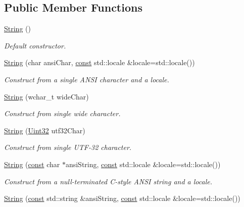 \subsection*{Public Member Functions}
\begin{DoxyCompactItemize}
\item 
\hyperlink{classsf_1_1_string_a9563a4e93f692e0c8e8702b374ef8692}{String} ()
\begin{DoxyCompactList}\small\item\em Default constructor. \end{DoxyCompactList}\item 
\hyperlink{classsf_1_1_string_ac9df7f7696cff164794e338f3c89ccc5}{String} (char ansi\-Char, \hyperlink{term__entry_8h_a57bd63ce7f9a353488880e3de6692d5a}{const} std\-::locale \&locale=std\-::locale())
\begin{DoxyCompactList}\small\item\em Construct from a single A\-N\-S\-I character and a locale. \end{DoxyCompactList}\item 
\hyperlink{classsf_1_1_string_aefaa202d2aa5ff85b4f75a5983367e86}{String} (wchar\-\_\-t wide\-Char)
\begin{DoxyCompactList}\small\item\em Construct from single wide character. \end{DoxyCompactList}\item 
\hyperlink{classsf_1_1_string_a8e1a5027416d121187908e2ed77079ff}{String} (\hyperlink{namespacesf_aa746fb1ddef4410bddf198ebb27e727c}{Uint32} utf32\-Char)
\begin{DoxyCompactList}\small\item\em Construct from single U\-T\-F-\/32 character. \end{DoxyCompactList}\item 
\hyperlink{classsf_1_1_string_a57d2b8c289f9894f859564cad034bfc7}{String} (\hyperlink{term__entry_8h_a57bd63ce7f9a353488880e3de6692d5a}{const} char $\ast$ansi\-String, \hyperlink{term__entry_8h_a57bd63ce7f9a353488880e3de6692d5a}{const} std\-::locale \&locale=std\-::locale())
\begin{DoxyCompactList}\small\item\em Construct from a null-\/terminated C-\/style A\-N\-S\-I string and a locale. \end{DoxyCompactList}\item 
\hyperlink{classsf_1_1_string_a0aa41dcbd17b0c36c74d03d3b0147f1e}{String} (\hyperlink{term__entry_8h_a57bd63ce7f9a353488880e3de6692d5a}{const} std\-::string \&ansi\-String, \hyperlink{term__entry_8h_a57bd63ce7f9a353488880e3de6692d5a}{const} std\-::locale \&locale=std\-::locale())

\end{DoxyCompactItemize}
